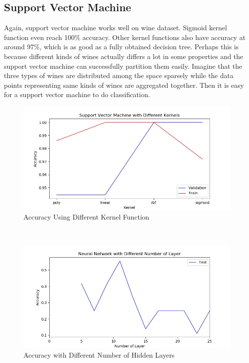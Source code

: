 \documentclass[11pt]{article}
\begin{document}
\subsection{Support Vector Machine}
Again, support vector machine works well on wine dataset. Sigmoid kernel function even reach 100\% accuracy. Other kernel functions also have accuracy at around 97\%, which is as good as a fully obtained decision tree. Perhaps this is because different kinds of wines actually differs a lot in some properties and the support vector machine can successfully partition them easily. Imagine that the three types of wines are distributed among the space sparsely while the data points representing same kinds of wines are aggregated together. Then it is easy for a support vector machine to do classification.
\begin{figure}[h!]
  \includegraphics[width=\linewidth]{./wine/svm_kernel.jpg}
  \caption{Accuracy Using Different Kernel Function}
  \label{fig:wine_svm}
\end{figure}\\
\begin{figure}[h!]
  \includegraphics[width=\linewidth]{./wine/nn_num_layer.jpg}
  \caption{Accuracy with Different Number of Hidden Layers}
  \label{fig:wine_nn}
\end{figure}
\end{document}
